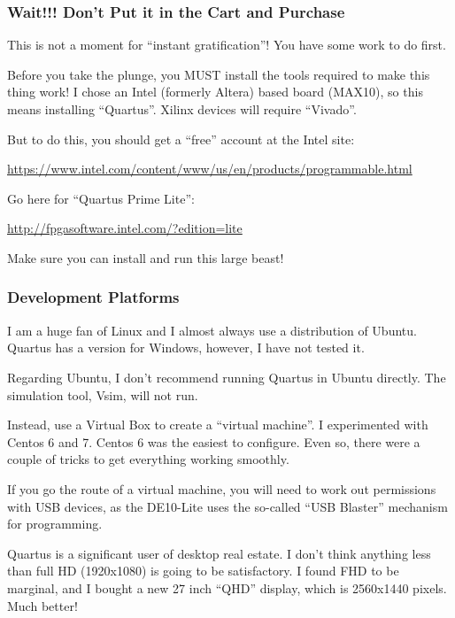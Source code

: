 \documentclass{beamer}
\begin{document}
\begin{frame}
\frametitle{Wait!!! Don't Put it in the Cart and Purchase}

This is not a moment for ``instant gratification''!  You have some work to do first.

Before you take the plunge, you MUST install the tools required to make this thing work!
I chose an Intel (formerly Altera) based board (MAX10), so this means installing ``Quartus''.  Xilinx devices will require ``Vivado''.

But to do this, you should get a ``free'' account at the Intel site:

\url{https://www.intel.com/content/www/us/en/products/programmable.html}

Go here for ``Quartus Prime Lite'':

\url{http://fpgasoftware.intel.com/?edition=lite}

Make sure you can install and run this large beast!

\end{frame}

\begin{frame}
\frametitle{Development Platforms}

I am a huge fan of Linux and I almost always use a distribution of Ubuntu.
Quartus has a version for Windows, however, I have not tested it.

Regarding Ubuntu, I don't recommend running Quartus in Ubuntu directly.  The simulation tool, Vsim, will not run.

Instead, use a Virtual Box to create a ``virtual machine''.  I experimented with Centos 6 and 7.  Centos 6 was the easiest to configure.  Even so, there were a couple of tricks to get everything working smoothly.

If you go the route of a virtual machine, you will need to work out permissions with USB devices, as the DE10-Lite uses the so-called ``USB Blaster'' mechanism for programming.

Quartus is a significant user of desktop real estate.  I don't think anything less than full HD (1920x1080) is going to be satisfactory.  I found FHD to be marginal, and I bought a new 27 inch ``QHD'' display, which is 2560x1440 pixels.  Much better!

\end{frame}
\end{document}
